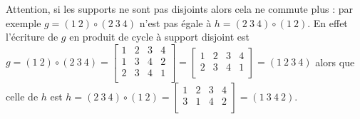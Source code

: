 \documentclass{book}
\begin{document}
Attention, si les supports ne sont pas disjoints alors cela ne commute plus :
par exemple $g = (1\ 2)\circ(2\ 3\ 4)$ n'est pas égale à $h=(2\ 3\ 4)\circ(1\ 2)$.
En effet l'écriture de $g$ en produit de cycle à support disjoint est
$g = (1\ 2)\circ(2\ 3\ 4) =
\left[\begin{smallmatrix}
 1 & 2 & 3 & 4 \\
 1 & 3 & 4 & 2 \\
 2 & 3 & 4 & 1 \\
\end{smallmatrix} \right] =
\left[\begin{smallmatrix}
 1 & 2 & 3 & 4 \\
 2 & 3 & 4 & 1 \\
\end{smallmatrix} \right] =
(1\ 2\ 3\ 4)$
alors que celle de $h$ est
$h = (2\ 3\ 4)\circ(1\ 2) =
\left[\begin{smallmatrix}
 1 & 2 & 3 & 4 \\
 3 & 1 & 4 & 2 \\
\end{smallmatrix} \right]
= (1\ 3\ 4\ 2)$.





\end{document}
